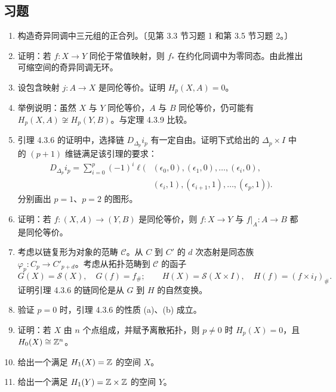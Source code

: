 \subsection*{习题}
\begin{enumerate}
\item 构造奇异同调中三元组的正合列。〔见第 3.3 节习题 1 和第 3.5 节习题 2。〕
\item 证明：若 $f:X\to Y$ 同伦于常值映射，则 $f_*$ 在约化同调中为零同态。由此推出可缩空间的奇异同调无环。
\item 设包含映射 $j:A\to X$ 是同伦等价。证明 $H_p(X,A)=0$。
\item 举例说明：虽然 $X$ 与 $Y$ 同伦等价，$A$ 与 $B$ 同伦等价，仍可能有 $H_p(X,A)\not\cong H_p(Y,B)$。与定理 4.3.9 比较。
\item 引理 4.3.6 的证明中，选择链 $D_{\Delta_p}i_p$ 有一定自由。证明下式给出的 $\Delta_p\times I$ 中的 $(p+1)$ 维链满足该引理的要求：
\[
\begin{split}
D_{\Delta_p}i_p=\sum_{i=0}^p(-1)^i\ell\bigl(& (\epsilon_0,0),(\epsilon_1,0),\ldots,(\epsilon_i,0),\\
& (\epsilon_i,1),(\epsilon_{i+1},1),\ldots,(\epsilon_p,1)\bigr).
\end{split}
\]
分别画出 $p=1$、$p=2$ 的图形。
\item 证明：若 $f:(X,A)\to(Y,B)$ 是同伦等价，则 $f:X\to Y$ 与 $f|_A:A\to B$ 都是同伦等价。
\item 考虑以链复形为对象的范畴 $\mathcal C$。从 $C$ 到 $C'$ 的 $d$ 次态射是同态族 $\varphi_p:C_p\to C'_{p+d}$。考虑从拓扑范畴到 $\mathcal C$ 的函子
\[
G(X)=\mathcal S(X),\quad G(f)=f_\#;\qquad
H(X)=\mathcal S(X\times I),\quad H(f)=(f\times i_I)_\#.
\]
证明引理 4.3.6 的链同伦是从 $G$ 到 $H$ 的自然变换。
\item 验证 $p=0$ 时，引理 4.3.6 的性质 (a)、(b) 成立。
\item 证明：若 $X$ 由 $n$ 个点组成，并赋予离散拓扑，则 $p\ne0$ 时 $H_p(X)=0$，且 $H_0(X)\cong\mathbb{Z}^n$。
\item 给出一个满足 $H_1(X)=\mathbb{Z}$ 的空间 $X$。
\item 给出一个满足 $H_1(Y)=\mathbb{Z}\times\mathbb{Z}$ 的空间 $Y$。
\end{enumerate}
